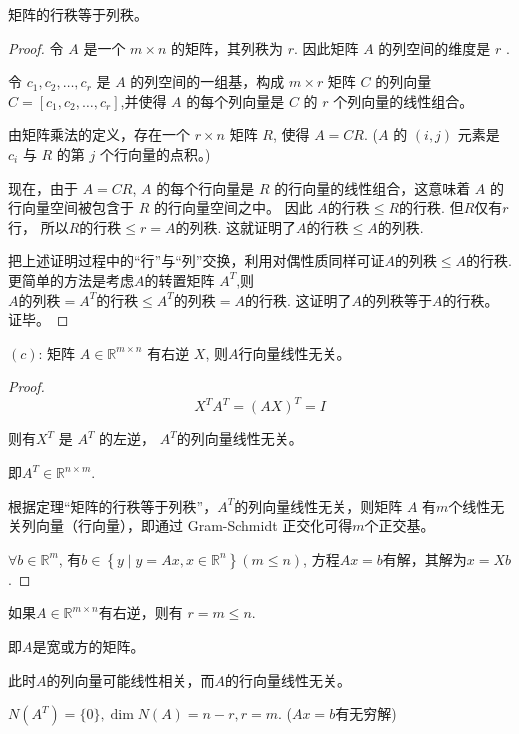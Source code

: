 \begin{theorem}
    矩阵的行秩等于列秩。
\end{theorem}

\begin{proof}
    令 $A$ 是一个 $m\times n$ 的矩阵，其列秩为 $r $. 因此矩阵 $A$ 的列空间的维度是 $r$ . 
    
    令 $c_1,c_2,\ldots,c_r$ 是 $A$ 的列空间的一组基，构成 $m \times r$ 矩阵 $C$ 的列向量 $C = [c_1,c_2,\ldots,c_r]$,并使得 $A$ 的每个列向量是 $C$ 的 $r$ 个列向量的线性组合。 
    
    由矩阵乘法的定义，存在一个 $r \times n$ 矩阵 $R$, 使得 $A = CR$. ($A$ 的 $(i,j)$ 元素是 $c_i$ 与 $R$ 的第 $j$ 个行向量的点积。)

现在，由于 $A = CR$, $A$ 的每个行向量是 $R$ 的行向量的线性组合，这意味着 $A$ 的行向量空间被包含于 $R$ 的行向量空间之中。 因此 $A 的行秩 \leq R的行秩$. 但$R$仅有$r$行， 所以$R的行秩 \leq r = A的列秩$. 这就证明了$A的行秩 \leq A的列秩$.

把上述证明过程中的“行”与“列”交换，利用对偶性质同样可证$A的列秩 \leq A的行秩$. 更简单的方法是考虑$A$的转置矩阵 $A^ {T}$,则$A的列秩 =  A^ {T}的行秩 \leq  A^ {T}的列秩 = A的行秩$. 这证明了$A$的列秩等于$A$的行秩。 证毕。
\end{proof}

\begin{theorem}
    $(c)$: 矩阵 $ A \in \mathbb{R}^{m \times n} $ 有右逆 $ X $, 则$A$行向量线性无关。
\end{theorem}

\begin{proof}
    \begin{equation}  {X}^{T} A^{T}=(A X)^{T}=I \end{equation}
    
    则有$  {X}^{T} $ 是 $ A^{T} $ 的左逆， $ A^{T} $的列向量线性无关。  

    即$ A^{T} \in \mathbb{R}^{n \times m} $.
    
    根据定理“矩阵的行秩等于列秩”，$ A^{T} $的列向量线性无关，则矩阵 $ A $ 有$m$个线性无关列向量（行向量），即通过 Gram-Schmidt 正交化可得$m$个正交基。 

    $ \forall b \in \mathbb{R}^{m} $, 有$ b \in\left\{y \mid y=A x, x \in \mathbb{R}^{n}\right\} (m \leq n ) $, 方程$ A x=b $有解，其解为$ x=X b $. 
\end{proof}

\begin{corollary}
    如果$ A \in \mathbb{R}^{m \times n} $有右逆，则有 $r= m \leq n  $. 

   即$A$是宽或方的矩阵。 

   此时$A$的列向量可能线性相关，而$A$的行向量线性无关。 
   
   $N(A^T) = \{0\}, \operatorname{dim} N(A) = n-r, r=m$. ($Ax=b$有无穷解) 
   \end{corollary}

